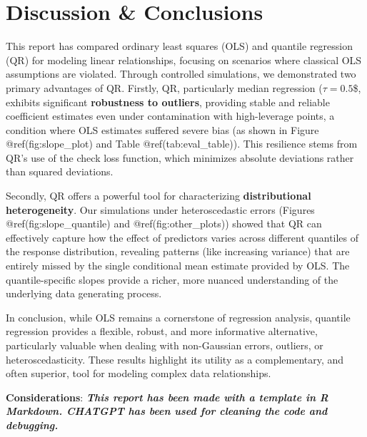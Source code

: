 \documentclass[fleqn,10pt]{latex/stylish_article} %
\begin{document}
\section{Discussion \& Conclusions}\label{discussion-conclusions}

This report has compared ordinary least squares (OLS) and quantile regression (QR) for modeling linear relationships, focusing on scenarios where classical OLS assumptions are violated. Through controlled simulations, we demonstrated two primary advantages of QR. Firstly, QR, particularly median regression (\(\tau=0.5\)\$, exhibits significant \textbf{robustness to outliers}, providing stable and reliable coefficient estimates even under contamination with high-leverage points, a condition where OLS estimates suffered severe bias (as shown in Figure @ref(fig:slope\_plot) and Table @ref(tab:eval\_table)). This resilience stems from QR's use of the check loss function, which minimizes absolute deviations rather than squared deviations.

Secondly, QR offers a powerful tool for characterizing \textbf{distributional heterogeneity}. Our simulations under heteroscedastic errors (Figures @ref(fig:slope\_quantile) and @ref(fig:other\_plots)) showed that QR can effectively capture how the effect of predictors varies across different quantiles of the response distribution, revealing patterns (like increasing variance) that are entirely missed by the single conditional mean estimate provided by OLS. The quantile-specific slopes provide a richer, more nuanced understanding of the underlying data generating process.

In conclusion, while OLS remains a cornerstone of regression analysis, quantile regression provides a flexible, robust, and more informative alternative, particularly valuable when dealing with non-Gaussian errors, outliers, or heteroscedasticity. These results highlight its utility as a complementary, and often superior, tool for modeling complex data relationships.

\textbf{Considerations}: \textbf{\emph{This report has been made with a template in R Markdown. CHATGPT has been used for cleaning the code and debugging.}}



\makeatletter

\makeatother


\end{document}
